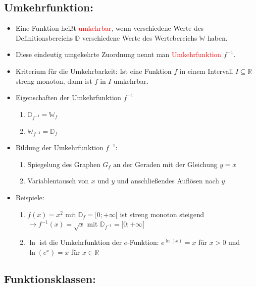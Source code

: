 \subsection{Umkehrfunktion:}
\begin{itemize}
    \item Eine Funktion heißt \textcolor{red}{umkehrbar}, wenn verschiedene Werte des Definitionsbereichs $\mathds{D}$ verschiedene Werte des Wertebereichs $\mathds{W}$ haben.
    \item Diese eindeutig umgekehrte Zuordnung nennt man \textcolor{red}{Umkehrfunktion} $f^{-1}$.
    \item Kriterium für die Umkehrbarkeit: Ist eine Funktion $f$ in einem Intervall $I \subseteq \mathds{R}$ streng monoton, dann ist $f$ in $I$ umkehrbar.
    \item Eigenschaften der Umkehrfunktion $f^{-1}$\\
    \begin{enumerate}
    \item $\mathds{D}_{f^{-1}} = \mathds{W}_f$ \item $\mathds{W}_{f^{-1}} = \mathds{D}_f$
\end{enumerate}
\item Bildung der Umkehrfunktion $f^{-1}$:\\
\begin{enumerate}
    \item Spiegelung des Graphen $G_f$ an der Geraden mit der Gleichung $y=x$\\
    \item Variablentausch von $x$ und $y$ und anschließendes Auflösen nach $y$
\end{enumerate}
\item Beispiele:\\
\begin{enumerate}
\item $f(x) = x^2$ mit $\mathds{D}_f = [0;+\infty[$ ist streng monoton steigend $\longrightarrow f^{-1}(x) = \sqrt{x}$ mit $\mathds{D}_{f^{-1}} = [0;+\infty[$\\
\item $\ln$ ist die Umkehrfunktion der $e$-Funktion: $e^{\ln(x)} = x$ für $x>0$ und $\ln(e^x) = x$ für $x\in\mathds{R}$
\end{enumerate}
\end{itemize}
\subsection{Funktionsklassen:}

